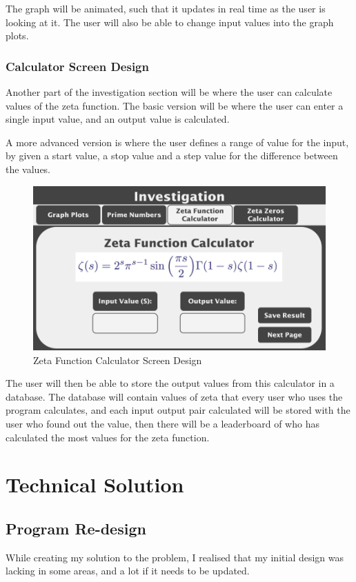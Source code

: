 \documentclass[12pt]{article}
\begin{document}
The graph will be animated, such that it updates in real time as the user is looking at it. The user will also be able to change input values into the graph plots.

\subsubsection{Calculator Screen Design}

Another part of the investigation section will be where the user can calculate values of the zeta function. The basic version will be where the user can enter a single input value, and an output value is calculated.

A more advanced version is where the user defines a range of value for the input, by given a start value, a stop value and a step value for the difference between the values.

\begin{figure}[h]
    \centering
    \includegraphics[scale=0.18]{zeta-function-calculator-screen-design}
    \caption{Zeta Function Calculator Screen Design}
\end{figure}

The user will then be able to store the output values from this calculator in a database. The database will contain values of zeta that every user who uses the program calculates, and each input output pair calculated will be stored with the user who found out the value, then there will be a leaderboard of who has calculated the most values for the zeta function.


\clearpage
\section{Technical Solution}

\subsection{Program Re-design}
While creating my solution to the problem, I realised that my initial design was lacking in some areas, and a lot if it needs to be updated.
\end{document}
